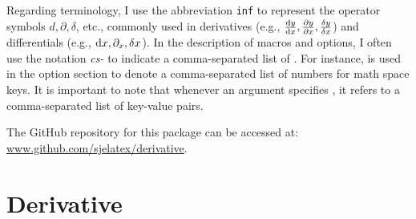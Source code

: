 \bigskip

Regarding terminology, I use the abbreviation \texttt{inf} to represent the operator symbols $d, \partial, \delta$, etc., commonly used in derivatives (e.g., $\odv{y}{x}, \pdv{y}{x}, \fdv{y}{x}$) and differentials (e.g., $\odif{x}, \pdif{x}, \fdif{x}$). In the description of macros and options, I often use the notation \emph{cs-} to indicate a comma-separated list of . For instance,  is used in the option section to denote a comma-separated list of numbers for math space keys. It is important to note that whenever an argument specifies , it refers to a comma-separated list of key-value pairs.

\bigskip

\noindent The GitHub repository for this package can be accessed at:\\ \href{https://github.com/sjelatex/derivative}{www.github.com/sjelatex/derivative}.


	
	\clearpage
	\section{Derivative}\label{sec:derivative}

